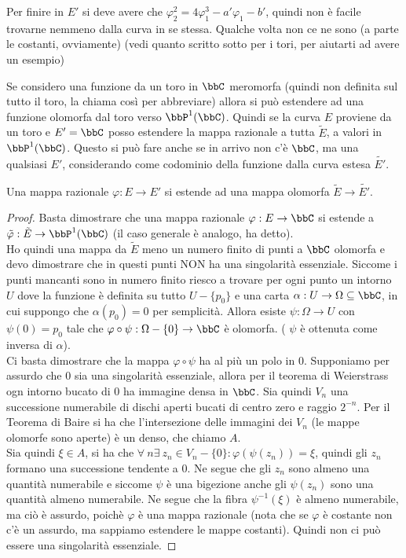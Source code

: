 \begin{osservazione}
Per finire in $E'$ si deve avere che $\varphi_2^2=4\varphi_1^3-a'\varphi_1-b'$, quindi non è facile trovarne nemmeno dalla curva in se stessa. Qualche volta non ce ne sono (a parte le costanti, ovviamente) (vedi quanto scritto sotto per i tori, per aiutarti ad avere un esempio)
\end{osservazione}

Se considero una funzione da un toro in $\bbC$ meromorfa (quindi non definita sul tutto il toro, la chiama così per abbreviare) allora si può estendere ad una funzione olomorfa dal toro verso $\bbP^1(\bbC)$.
Quindi se la curva $E$ proviene da un toro e $E'=\bbC$ posso estendere la mappa razionale a tutta $\tilde{E}$, a valori in $\bbP^1(\bbC)$.
Questo si può fare anche se in arrivo non c'è $\bbC$, ma una qualsiasi $E'$, considerando come codominio della funzione dalla curva estesa $\tilde{E'}$.

\begin{proposizione}
Una mappa razionale $\varphi: E\rightarrow E'$ si estende ad una mappa olomorfa $\tilde{E} \rightarrow \tilde {E'}$.
\end{proposizione}

\begin{proof}
Basta dimostrare che una mappa razionale $\varphi:E\rightarrow \bbC$ si estende a $\tilde{\varphi}:\tilde{E}\rightarrow\bbP^1(\bbC)$ (il caso generale è analogo, ha detto).\\
Ho quindi una mappa da $\tilde{E}$ meno un numero finito di punti a $\bbC$ olomorfa e devo dimostrare che in questi punti NON ha una singolarità essenziale. Siccome i punti mancanti sono in numero finito riesco a trovare per ogni punto un intorno $U$ dove la funzione è definita su tutto $U-\{ p_0\}$ e una carta $\alpha: U\rightarrow \Omega\subseteq\bbC$, in cui suppongo che $\alpha(p_0)=0$ per semplicità. Allora esiste $\psi:\Omega\rightarrow U$ con $\psi(0)=p_0$ tale che $\varphi\circ\psi:\Omega-\{ 0\}\rightarrow \bbC$ è olomorfa. ( $\psi$ è ottenuta come inversa di $\alpha$).\\
Ci basta dimostrare che la mappa $\varphi\circ\psi$ ha al più un polo in $0$.
Supponiamo per assurdo che $0$ sia una singolarità essenziale, allora per il teorema di Weierstrass ogn intorno bucato di $0$ ha immagine densa in $\bbC$. Sia quindi $V_n$ una successione numerabile di dischi aperti bucati di centro zero e raggio $2^{-n}$. Per il Teorema di Baire si ha che l'intersezione delle immagini dei $V_n$ (le mappe olomorfe sono aperte) è un denso, che chiamo $A$.\\
Sia quindi $\xi\in A$, si ha che $\forall\ n \exists\ z_n\in V_n - \{ 0 \} : \varphi ( \psi(z_n ))=\xi$, quindi gli $z_n$ formano una successione tendente a $0$. Ne segue che gli $z_n$ sono almeno una quantità numerabile e siccome $\psi$ è una bigezione anche gli $\psi(z_n)$ sono una quantità almeno numerabile. Ne segue che la fibra $\psi^{-1} (\xi )$ è almeno numerabile, ma ciò è assurdo, poichè $\varphi$ è una mappa razionale (nota che se $\varphi$ è costante non c'è un assurdo, ma sappiamo estendere le mappe costanti). Quindi non ci può essere una singolarità essenziale.
\end{proof}


